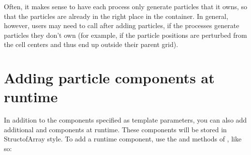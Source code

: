 \documentclass[letterpaper,10pt,english]{sphinxmanual}
\begin{document}
\begin{sphinxVerbatim}[commandchars=\\\{\}]

\end{sphinxVerbatim}

\sphinxAtStartPar
Often, it makes sense to have each process only generate particles that it
owns, so that the particles are already in the right place in the container.
In general, however, users may need to call  after adding
particles, if the processes generate particles they don’t own (for example, if
the particle positions are perturbed from the cell centers and thus end up
outside their parent grid).


\section{Adding particle components at runtime}
\label{\detokenize{Particle:adding-particle-components-at-runtime}}\label{\detokenize{Particle:sec-particles-runtime}}
\sphinxAtStartPar
In addition to the components specified as template parameters, you can also
add additional  and  components at runtime. These components
will be stored in Struct\sphinxhyphen{}of\sphinxhyphen{}Array style. To add a runtime component, use the
 and  methods of , like so:

\begin{sphinxVerbatim}[commandchars=\\\{\}]
    
        
        
\end{sphinxVerbatim}
\end{document}
